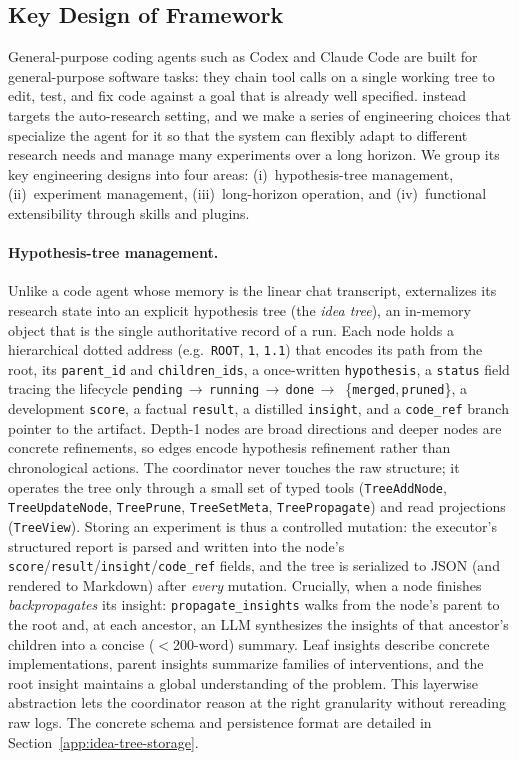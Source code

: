 \subsection{Key Design of \arbor{} Framework}
\label{app:framework-key-design}
General-purpose coding agents such as Codex and Claude Code are built for
general-purpose software tasks: they chain tool calls on a single working tree
to edit, test, and fix code against a goal that is already well specified.
\arbor{} instead targets the auto-research setting, and we make a series of
engineering choices that specialize the agent for it so that the system can
flexibly adapt to different research needs and manage many experiments over a
long horizon. We group its key engineering designs into four areas: (i)~hypothesis-tree management,
(ii)~experiment management, (iii)~long-horizon operation, and (iv)~functional
extensibility through skills and plugins.

\paragraph{Hypothesis-tree management.}
Unlike a code agent whose memory is the linear chat transcript, \arbor{}
externalizes its research state into an explicit hypothesis tree (the
\emph{idea tree}), an in-memory object that is the single authoritative record
of a run. Each node holds a hierarchical dotted address (e.g.\ \texttt{ROOT},
\texttt{1}, \texttt{1.1}) that encodes its path from the root, its
\texttt{parent\_id} and \texttt{children\_ids}, a once-written
\texttt{hypothesis}, a \texttt{status} field tracing the lifecycle
\texttt{pending}\,$\to$\,\texttt{running}\,$\to$\,\texttt{done}\,$\to$\,%
\{\texttt{merged},\,\texttt{pruned}\}, a development \texttt{score}, a factual
\texttt{result}, a distilled \texttt{insight}, and a \texttt{code\_ref} branch
pointer to the artifact. Depth-1 nodes are broad directions and deeper nodes are
concrete refinements, so edges encode hypothesis refinement rather than
chronological actions. The coordinator never touches the raw structure; it
operates the tree only through a small set of typed tools
(\texttt{TreeAddNode}, \texttt{TreeUpdateNode}, \texttt{TreePrune},
\texttt{TreeSetMeta}, \texttt{TreePropagate}) and read projections
(\texttt{TreeView}). Storing an experiment is thus a controlled mutation: the
executor's structured report is parsed and written into the node's
\texttt{score}/\texttt{result}/\texttt{insight}/\texttt{code\_ref} fields, and
the tree is serialized to JSON (and rendered to Markdown) after \emph{every}
mutation. Crucially, when a node finishes \arbor{} \emph{backpropagates} its
insight: \texttt{propagate\_insights} walks from the node's parent to the root
and, at each ancestor, an LLM synthesizes the insights of that ancestor's
children into a concise ($<$200-word) summary. Leaf insights describe concrete
implementations, parent insights summarize families of interventions, and the
root insight maintains a global understanding of the problem. This layerwise
abstraction lets the coordinator reason at the right granularity without
rereading raw logs. The concrete schema and persistence format are detailed in
Section~\ref{app:idea-tree-storage}.

